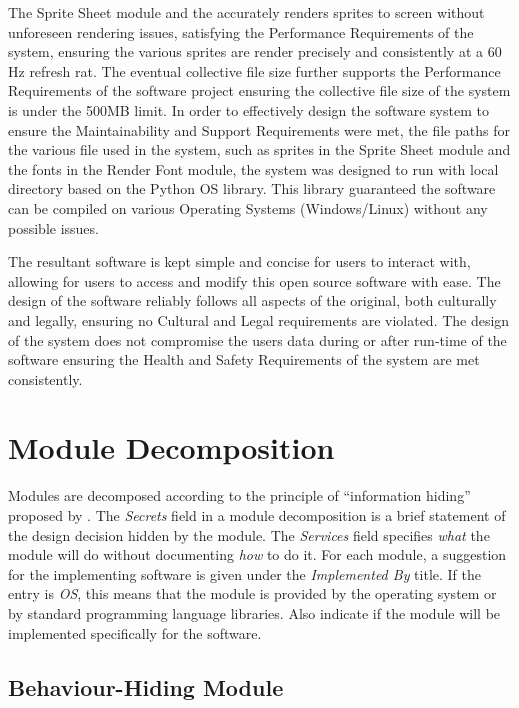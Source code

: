 \documentclass[12pt, titlepage]{article}
\begin{document}
The Sprite Sheet module and the  accurately renders sprites to screen without unforeseen rendering issues, satisfying the Performance Requirements of the system, ensuring the various sprites are render precisely and consistently at a 60 Hz refresh rat. The eventual collective file size further supports the Performance Requirements of the software project ensuring the collective file size of the system is under the 500MB limit. In order to effectively design the software system to ensure the Maintainability and Support Requirements were met, the file paths for the various file used in the system, such as sprites in the Sprite Sheet module and the fonts in the Render Font module, the system was designed to run with local directory based on the Python OS library. This library guaranteed the software can be compiled on  various Operating Systems (Windows/Linux) without any possible issues. 

The resultant software is kept simple and concise for users to interact with, allowing for users to access and modify this open source software with ease. The design of the software reliably follows all aspects of the original, both culturally and legally, ensuring no Cultural and Legal requirements are violated. The design of the system does not compromise the users data during or after run-time of the software ensuring the Health and Safety Requirements of the system are met consistently.
\section{Module Decomposition} \label{SecMD}

Modules are decomposed according to the principle of ``information hiding''
proposed by \citet{ParnasEtAl1984}. The \emph{Secrets} field in a module
decomposition is a brief statement of the design decision hidden by the
module. The \emph{Services} field specifies \emph{what} the module will do
without documenting \emph{how} to do it. For each module, a suggestion for the
implementing software is given under the \emph{Implemented By} title. If the
entry is \emph{OS}, this means that the module is provided by the operating
system or by standard programming language libraries.  Also indicate if the
module will be implemented specifically for the software.

\subsection{Behaviour-Hiding Module}
\end{document}
